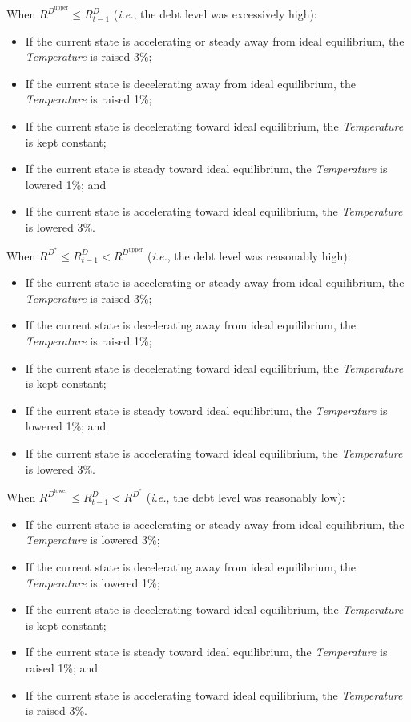 \documentclass[tikz]{article}
\newcommand{\term}[1]{\textsl{#1}}
\begin{document}
\newpage
When $R^{D^{\text{upper}}} \leq R^D_{t-1}$ (\term{i.e.}, the debt level was excessively high):
\begin{itemize}[midsep]
    \item If the current state is accelerating or steady away from ideal equilibrium, the \term{Temperature} is raised 3\%;
    \item If the current state is decelerating away from ideal equilibrium, the \term{Temperature} is raised 1\%;
    \item If the current state is decelerating toward ideal equilibrium, the \term{Temperature} is kept constant;
    \item If the current state is steady toward ideal equilibrium, the \term{Temperature} is lowered 1\%; and
    \item If the current state is accelerating toward ideal equilibrium, the \term{Temperature} is lowered 3\%.
\end{itemize}

When $R^{D^*} \leq R^D_{t-1} < R^{D^{\text{upper}}}$ (\term{i.e.}, the debt level was reasonably high):
\begin{itemize}[midsep]
    \item If the current state is accelerating or steady away from ideal equilibrium, the \term{Temperature} is raised 3\%;
    \item If the current state is decelerating away from ideal equilibrium, the \term{Temperature} is raised 1\%;
    \item If the current state is decelerating toward ideal equilibrium, the \term{Temperature} is kept constant;
    \item If the current state is steady toward ideal equilibrium, the \term{Temperature} is lowered 1\%; and
    \item If the current state is accelerating toward ideal equilibrium, the \term{Temperature} is lowered 3\%.
\end{itemize}

When $ R^{D^{\text{lower}}} \leq R^D_{t-1} < R^{D^*}$ (\term{i.e.}, the debt level was reasonably low):
\begin{itemize}[midsep]
    \item If the current state is accelerating or steady away from ideal equilibrium, the \term{Temperature} is lowered 3\%;
    \item If the current state is decelerating away from ideal equilibrium, the \term{Temperature} is lowered 1\%;
    \item If the current state is decelerating toward ideal equilibrium, the \term{Temperature} is kept constant;
    \item If the current state is steady toward ideal equilibrium, the \term{Temperature} is raised 1\%; and
    \item If the current state is accelerating toward ideal equilibrium, the \term{Temperature} is raised 3\%.
\end{itemize}
\end{document}

